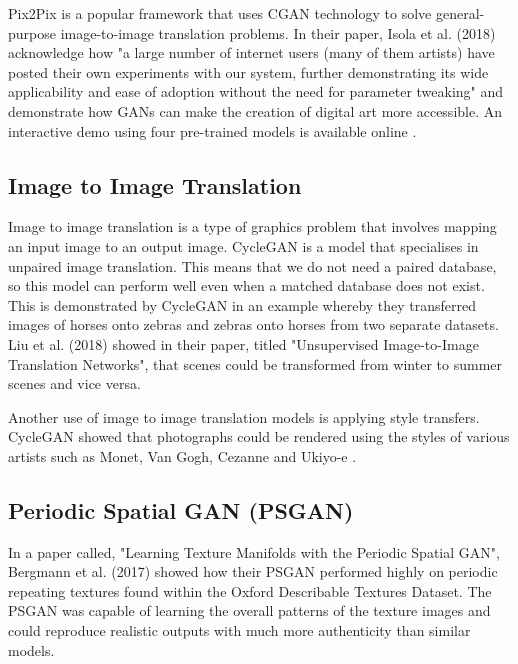 \noindent Pix2Pix \cite{isola2018imagetoimage} is a popular framework that uses CGAN technology to solve general-purpose image-to-image translation problems. In their paper, Isola et al. (2018) acknowledge how "a large number of internet users (many of them artists)
have posted their own experiments with our system, further
demonstrating its wide applicability and ease of adoption
without the need for parameter tweaking" and demonstrate how GANs can make the creation of digital art more accessible. An interactive demo using four pre-trained models is available online \cite{imagetoimagedemo}. 

\subsection{Image to Image Translation}
\label{subsec:imagetoimagetranslation}
Image to image translation is a type of graphics problem that involves mapping an input image to an output image. CycleGAN \cite{zhu2020unpairedcyclegan} is a model that specialises in unpaired image translation. This means that we do not need a paired database, so this model can perform well even when a matched database does not exist. This is demonstrated by CycleGAN in an example whereby they transferred images of horses onto zebras and zebras onto horses from two separate datasets. Liu et al. (2018) \cite{liu2018unsupervisedimagetoimage} showed in their paper, titled "Unsupervised Image-to-Image Translation Networks", that scenes could be transformed from winter to summer scenes and vice versa. 

\noindent Another use of image to image translation models is applying style transfers. CycleGAN showed that photographs could be rendered using the styles of various artists such as Monet, Van Gogh, Cezanne and Ukiyo-e \cite{zhu2020unpairedcyclegan}.

\subsection{Periodic Spatial GAN (PSGAN)}
\label{subsec:periodicspatialgan}
In a paper called, "Learning Texture Manifolds with the Periodic Spatial GAN", Bergmann et al. (2017) \cite{bergmann2017learningtexturemanifold} showed how their PSGAN performed highly on periodic repeating textures found within the Oxford Describable Textures Dataset. The PSGAN was capable of learning the overall patterns of the texture images and could reproduce realistic outputs with much more authenticity than similar models.

